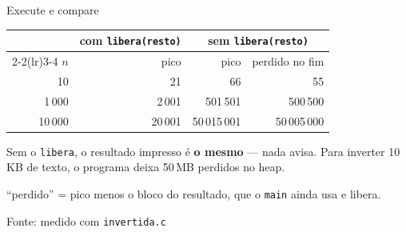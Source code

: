 \documentclass[aspectratio=169]{beamer}
\newcommand{\fonte}[1]{\vfill\hfill{\scriptsize\textcolor{UFSGray}{Fonte: #1}}}
\begin{document}
\begin{frame}[fragile]{Execute e compare}
  \begin{center}
    \small
    \begin{tabular}{@{}rrrr@{}}
      \toprule
      & \multicolumn{1}{c}{com \texttt{libera(resto)}}
      & \multicolumn{2}{c}{sem \texttt{libera(resto)}}\\
      \cmidrule(lr){2-2}\cmidrule(lr){3-4}
      $n$ & pico & pico & perdido no fim\\
      \midrule
      10      & 21       & 66           & 55\\
      1\,000  & 2\,001   & 501\,501     & 500\,500\\
      10\,000 & 20\,001  & 50\,015\,001 & 50\,005\,000\\
      \bottomrule
    \end{tabular}
  \end{center}
  \begin{block}{}
    \small Sem o \texttt{libera}, o resultado impresso é \textbf{o mesmo} ---
    nada avisa. Para inverter 10\,KB de texto, o programa deixa 50\,MB
    perdidos no heap.
  \end{block}
  \begin{center}
    \scriptsize\textcolor{UFSGray}{``perdido'' = pico menos o bloco do
    resultado, que o \texttt{main} ainda usa e libera.}
  \end{center}
  \fonte{medido com \texttt{invertida.c}}
\end{frame}
\end{document}

